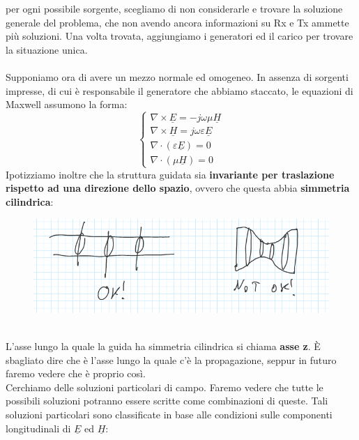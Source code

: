 \documentclass{book}
\begin{document}
        per ogni possibile sorgente, scegliamo di non considerarle e trovare la soluzione generale del problema, che non avendo ancora informazioni su Rx e Tx ammette più soluzioni.
        Una volta trovata, aggiungiamo i generatori ed il carico per trovare la situazione unica. \\ \\
        Supponiamo ora di avere un mezzo normale ed omogeneo. In assenza di sorgenti impresse, di cui è responsabile il generatore che abbiamo staccato, le equazioni di Maxwell
        assumono la forma:
        \begin{equation}
            \begin{cases}
                \nabla \times \underline{E} = -j \omega \mu \underline{H} \\
                \nabla \times \underline{H} =j \omega \varepsilon \underline{E} \\
                \nabla \cdot (\varepsilon \underline{E}) = 0 \\
                \nabla \cdot (\mu\underline{H}) = 0
            \end{cases}
        \end{equation}
        Ipotizziamo inoltre che la struttura guidata sia \textbf{invariante per traslazione rispetto ad una direzione dello spazio}, ovvero
        che questa abbia \textbf{simmetria cilindrica}:
        \begin{figure}[h!]
            \center  
            \includegraphics[width=0.75\linewidth]{Chapter_two/Chapt2img2.png}
        \end{figure} \\
        L'asse lungo la quale la guida ha simmetria cilindrica si chiama \textbf{asse z}. È sbagliato dire che
        è l'asse lungo la quale c'è la propagazione, seppur in futuro faremo vedere che è proprio così. \\
        Cerchiamo delle soluzioni particolari di campo. Faremo vedere che tutte le possibili soluzioni
        potranno essere scritte come combinazioni di queste. Tali soluzioni particolari sono classificate in base
        alle condizioni sulle componenti longitudinali di $\underline{E}$ ed $\underline{H}$:
\end{document}
